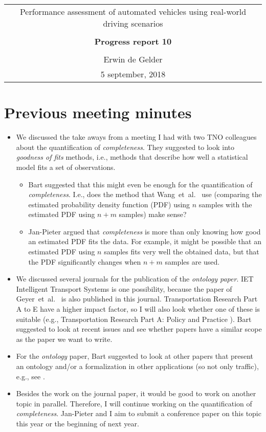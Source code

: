 \documentclass[10pt,final,a4paper,oneside,onecolumn]{article}
\newcommand{\progressreportnumber}{10}
\renewcommand{\author}{Erwin de Gelder}
\renewcommand{\date}{5 september, 2018}
\renewcommand{\title}{Performance assessment of automated vehicles using real-world driving scenarios}
\begin{document}
	
\begin{center}
	\begin{tabular}{c}
		\title \\ \\
		\textbf{\huge Progress report \progressreportnumber} \\ \\
		\author \\ 
		\date
	\end{tabular}
\end{center}

\section{Previous meeting minutes}

\begin{itemize}
	\item We discussed the take aways from a meeting I had with two TNO colleagues about the quantification of \emph{completeness}. They suggested to look into \emph{goodness of fits} methods, i.e., methods that describe how well a statistical model fits a set of observations. 
	\begin{itemize}
		\item Bart suggested that this might even be enough for the quantification of \emph{completeness}. I.e., does the method that Wang~et~al.\ \cite{wang2017much} use (comparing the estimated probability density function (PDF) using $n$ samples with the estimated PDF using $n+m$ samples) make sense?
		\item Jan-Pieter argued that \emph{completeness} is more than only knowing how good an estimated PDF fits the data. For example, it might be possible that an estimated PDF using $n$ samples fits very well the obtained data, but that the PDF significantly changes when $n+m$ samples are used.
	\end{itemize}
	\item We discussed several journals for the publication of the \emph{ontology paper}. IET Intelligent Transport Systems is one possibility, because the paper of Geyer~et~al.\ \cite{geyer2014} is also published in this journal. Transportation Research Part A to E have a higher impact factor, so I will also look whether one of these is suitable (e.g., Transportation Research Part A: Policy and Practice \cite{kalra2016driving, fagnant2015preparing}). Bart suggested to look at recent issues and see whether papers have a similar scope as the paper we want to write.
	\item For the \emph{ontology} paper, Bart suggested to look at other papers that present an ontology and/or a formalization in other applications (so not only traffic), e.g., see \cite{vanDamPhDThesis2009, vanDam2010model}.
	\item Besides the work on the journal paper, it would be good to work on another topic in parallel. Therefore, I will continue working on the quantification of \emph{completeness}. Jan-Pieter and I aim to submit a conference paper on this topic this year or the beginning of next year.
\end{itemize}
\end{document}
